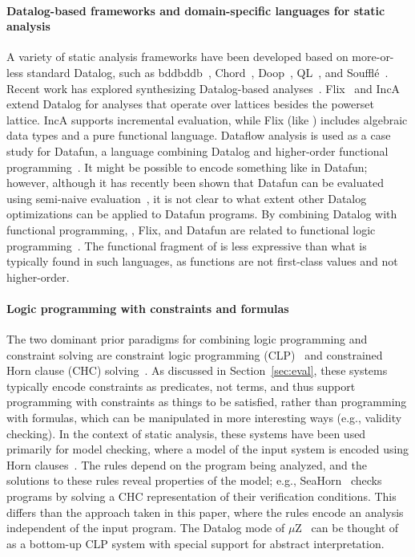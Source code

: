 \documentclass[acmsmall,screen,nonacm]{acmart}
\theoremstyle{definition}
\begin{document}
\paragraph{Datalog-based frameworks and domain-specific languages for static
analysis}
A variety of static analysis frameworks have been developed based on
more-or-less standard Datalog, such as bddbddb~\citep{bddbddbUsing},
Chord~\citep{chord}, Doop~\citep{doop}, QL~\citep{ql}, and
Souffl\'e~\citep{souffle2}.
Recent work has explored synthesizing Datalog-based
analyses~\citep{datalogsynthesis,provenancesynthesis}.
Flix~\citep{flix} and IncA~\citep{inca} extend Datalog for analyses that
operate over lattices besides the powerset lattice.
IncA supports incremental evaluation, while Flix (like \Name) includes
algebraic data types and a pure functional language.
Dataflow analysis is used as a case study for Datafun, a language combining
Datalog and higher-order functional programming~\citep{datafun}.
It might be possible to encode something like \Name in Datafun; however,
although it has recently been shown that Datafun can be evaluated using
semi-naive evaluation~\citep{datafunseminaive}, it is not clear to what extent
other Datalog optimizations can be applied to Datafun programs.
By combining Datalog with functional programming, \Name, Flix, and Datafun are
related to functional logic programming~\citep{flp}.
The functional fragment of \Name is less expressive than what is typically
found in such languages, as \Name functions are not first-class values and not
higher-order.

\paragraph{Logic programming with constraints and formulas}

The two dominant prior paradigms for combining logic programming and constraint
solving are constraint logic programming (CLP)~\citep{clp,clpsurvey} and constrained Horn clause
(CHC) solving~\citep{hfc,gurfinkel2015seahorn,hoder2012generalized,bjorner2015horn}.
As discussed in Section~\ref{sec:eval}, these systems typically encode
constraints as predicates, not terms, and thus support programming with
constraints as things to be satisfied, rather than programming with formulas, which can be manipulated in more interesting ways (e.g., validity checking).
In the context of static analysis, these systems have been used primarily for
model checking, where a model of the input system is encoded using Horn
clauses~\citep{bjorner2015horn,clpmodelchecking,flanagan2004automatic,fribourg1996symbolic,hfc}.
The rules depend on the program being analyzed, and the solutions
to these rules reveal properties of the model; e.g.,
SeaHorn~\citep{gurfinkel2015seahorn} checks programs by solving a CHC
representation of their verification conditions.
This differs than the approach taken in this paper, where the rules encode an
analysis independent of the input program.
The Datalog mode of $\mu$Z~\citep{hoder2011muz} can be thought of as a
bottom-up CLP system with special support for abstract interpretation.
\end{document}
